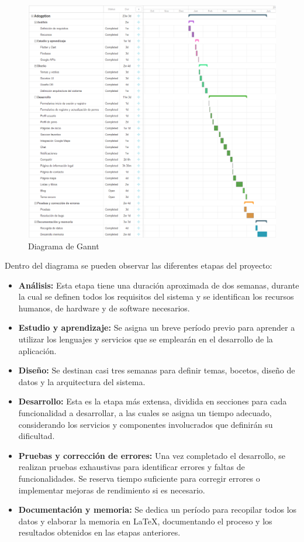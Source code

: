 \documentclass[a4paper, 12pt]{article}
\begin{document}
\begin{figure}[H]
	{\includegraphics[width=15cm]{diagram/GanntSmall2.png}\par}
	\caption{Diagrama de Gannt}
\end{figure}

Dentro del diagrama se pueden observar las diferentes etapas del proyecto:

\begin{itemize}[noitemsep]
	\item \textbf{Análisis:} Esta etapa tiene una duración aproximada de dos semanas, durante la cual se definen todos los requisitos del sistema y se identifican los recursos humanos, de hardware y de software necesarios.
	\item \textbf{Estudio y aprendizaje:} Se asigna un breve período previo para aprender a utilizar los lenguajes y servicios que se emplearán en el desarrollo de la aplicación.
	\item \textbf{Diseño:} Se destinan casi tres semanas para definir temas, bocetos, diseño de datos y la arquitectura del sistema.
	\item \textbf{Desarrollo:} Esta es la etapa más extensa, dividida en secciones para cada funcionalidad a desarrollar, a las cuales se asigna un tiempo adecuado, considerando los servicios y componentes involucrados que definirán su dificultad.
	\item \textbf{Pruebas y corrección de errores:} Una vez completado el desarrollo, se realizan pruebas exhaustivas para identificar errores y faltas de funcionalidades. Se reserva tiempo suficiente para corregir errores o implementar mejoras de rendimiento si es necesario.
	\item \textbf{Documentación y memoria:} Se dedica un período para recopilar todos los datos y elaborar la memoria en LaTeX, documentando el proceso y los resultados obtenidos en las etapas anteriores.
\end{itemize}
\end{document}
